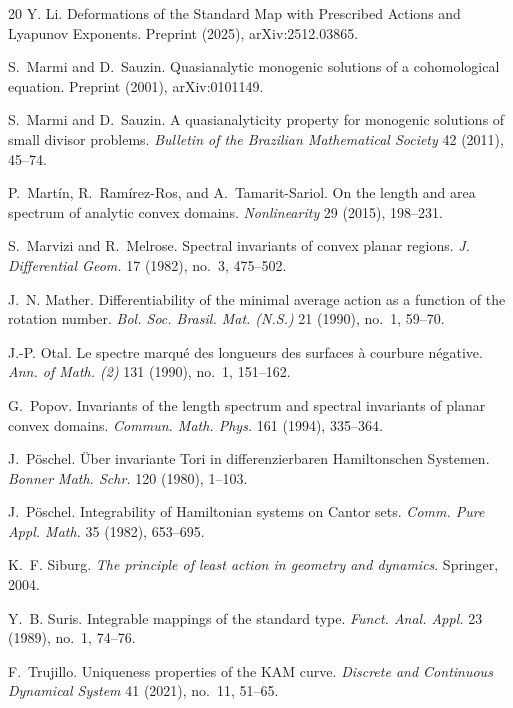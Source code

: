 \documentclass[10pt]{article}
\begin{document}
\begin{thebibliography}{20}
Y. Li.
\newblock Deformations of the Standard Map with Prescribed Actions and Lyapunov Exponents.
\newblock Preprint (2025), arXiv:2512.03865.

S.~Marmi and D.~Sauzin.
\newblock Quasianalytic monogenic solutions of a cohomological equation.
\newblock Preprint (2001), arXiv:0101149.

S.~Marmi and D.~Sauzin.
\newblock A quasianalyticity property for monogenic solutions of small divisor problems.
\newblock \emph{Bulletin of the Brazilian Mathematical Society} 42 (2011), 45--74.

P.~Martín, R.~Ramírez-Ros, and A.~Tamarit-Sariol.
\newblock On the length and area spectrum of analytic convex domains. \newblock \emph{Nonlinearity} 29 (2015), 198--231.

S.~Marvizi and R.~Melrose.
\newblock Spectral invariants of convex planar regions.
\newblock \emph{J. Differential Geom.} 17 (1982), no.~3, 475--502.

J.~N. Mather.
\newblock Differentiability of the minimal average action as a function of the rotation number.
\newblock \emph{Bol. Soc. Brasil. Mat. (N.S.)} 21 (1990), no.~1, 59--70.

J.-P. Otal.
\newblock Le spectre marqué des longueurs des surfaces à courbure négative.
\newblock \emph{Ann. of Math. (2)} 131 (1990), no.~1, 151--162.

G.~Popov.
\newblock Invariants of the length spectrum and spectral invariants of planar convex domains.
\newblock \emph{Commun. Math. Phys.} 161 (1994), 335--364.

J.~P\"oschel.
\newblock \"Uber invariante Tori in differenzierbaren Hamiltonschen Systemen.
\newblock \emph{Bonner Math. Schr.} 120 (1980), 1--103.

J.~P\"oschel.
\newblock Integrability of Hamiltonian systems on Cantor sets.
\newblock \emph{Comm. Pure Appl. Math.} 35 (1982), 653--695.

K.~F. Siburg.
\newblock \emph{The principle of least action in geometry and dynamics}.
\newblock Springer, 2004.

Y.~B. Suris.
\newblock Integrable mappings of the standard type.
\newblock \emph{Funct. Anal. Appl.} 23 (1989), no.~1, 74--76.

F.~Trujillo.
\newblock Uniqueness properties of the {KAM} curve.
\newblock \emph{Discrete and Continuous Dynamical System} 41 (2021), no.~11, 51--65.


\end{thebibliography}
\end{document}
